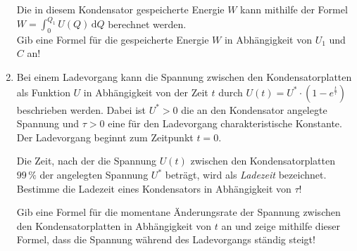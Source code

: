 \begin{langesbeispiel}
\begin{enumerate}
	Die in diesem Kondensator gespeicherte Energie $W$ kann mithilfe der Formel $W=\displaystyle\int^{Q_1}_0U(Q)\,\text{d}Q$ berechnet werden.\\
	Gib eine Formel für die gespeicherte Energie $W$ in Abhängigkeit von $U_1$ und $C$ an!
	
	\item Bei einem Ladevorgang kann die Spannung zwischen den Kondensatorplatten als Funktion $U$ in Abhängigkeit von der Zeit $t$ durch $U(t)=U^*\cdot\left(1-e^{\frac{t}{\tau}}\right)$ beschrieben werden. Dabei ist $U^*>0$ die an den Kondensator angelegte Spannung und $\tau>0$ eine für den Ladevorgang charakteristische Konstante. Der Ladevorgang beginnt zum Zeitpunkt $t=0$.
	
	Die Zeit, nach der die Spannung $U(t)$ zwischen den Kondensatorplatten $99\,\%$ der angelegten Spannung $U^*$ beträgt, wird als \textit{Ladezeit} bezeichnet.\\
	Bestimme die Ladezeit eines Kondensators in Abhängigkeit von $\tau$!
	
	Gib eine Formel für die momentane Änderungsrate der Spannung zwischen den Kondensatorplatten in Abhängigkeit von $t$ an und zeige mithilfe dieser Formel, dass die Spannung während des Ladevorgangs ständig steigt!
\end{enumerate}

\end{langesbeispiel}
